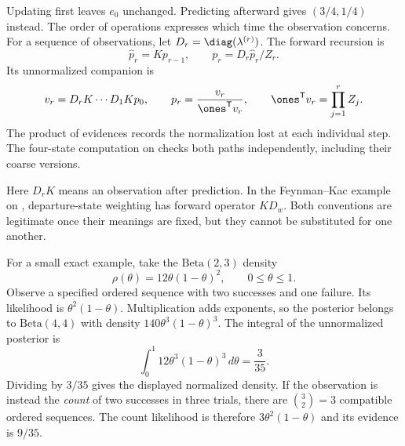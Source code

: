Updating first leaves $e_0$ unchanged. Predicting afterward gives $(3/4,1/4)$ instead. The order of operations expresses which time the observation concerns.
For a sequence of observations, let $D_r=\diag(\lambda^{(r)})$. The forward recursion is
\[
\widehat p_r=Kp_{r-1},\qquad p_r=D_r\widehat p_r/Z_r.
\]
Its unnormalized companion is
\[
v_r=D_rK\cdots D_1Kp_0,
\qquad p_r=\frac{v_r}{\ones^{\mathsf T}v_r},
\qquad \ones^{\mathsf T}v_r=\prod_{j=1}^r Z_j.
\]
The product of evidences records the normalization lost at each individual step. The four-state computation on  checks both paths independently, including their coarse versions.

Here $D_rK$ means an observation after prediction. In the Feynman--Kac example on , departure-state weighting has forward operator $K D_w$. Both conventions are legitimate once their meanings are fixed, but they cannot be substituted for one another.

For a small exact example, take the $\mathrm{Beta}(2,3)$ density
\[
\rho(\theta)=12\theta(1-\theta)^2,\qquad0\le\theta\le1.
\]
Observe a specified ordered sequence with two successes and one failure. Its likelihood is $\theta^2(1-\theta)$. Multiplication adds exponents, so the posterior belongs to $\mathrm{Beta}(4,4)$ with density $140\theta^3(1-\theta)^3$.
The integral of the unnormalized posterior is
\[
\int_0^1 12\theta^3(1-\theta)^3\,d\theta=\frac3{35}.
\]
Dividing by $3/35$ gives the displayed normalized density. If the observation is instead the \emph{count} of two successes in three trials, there are $\binom32=3$ compatible ordered sequences. The count likelihood is therefore $3\theta^2(1-\theta)$ and its evidence is $9/35$.

